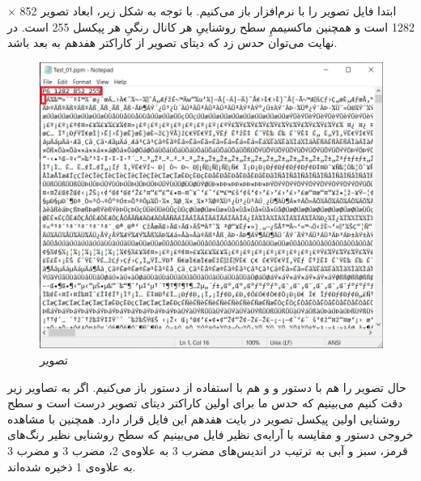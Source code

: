 \documentclass{article}
\begin{document}


\newpage


\section{}%
ابتدا فایل تصویر را با نرم‌افزار  باز می‌کنیم. با توجه به شکل زیر، ابعاد تصویر
852
$\times$
1282 است و همچنین ماکسیممِ سطح روشناییِ هر کانال رنگیِ هر پیکسل 255 است. در نهایت می‌توان حدس زد که دیتای تصویر از کاراکتر هفدهم به بعد باشد.
\begin{figure}[H]
    \centering
    \includegraphics[width=1\textwidth]{figures/1a.jpg}
    \caption
	{
تصویر
	}
    \label{fig:fig1}
\end{figure}
حال تصویر را هم با دستور  و  و هم با استفاده از دستور  باز می‌کنیم. اگر به تصاویر زیر دقت کنیم می‌بینیم که حدس ما برای اولین کاراکتر دیتای تصویر درست است و سطح روشنایی اولین پیکسل تصویر در بایت هفدهم این فایل قرار دارد. همچنین با مشاهده خروجی دستور  و مقایسه با آرایه‌ی نظیر فایل می‌بینیم که سطح روشنایی نظیر رنگ‌های قرمز، سبز و آبی به ترتیب در اندیس‌های مضرب 3 به علاوه‌ی 2، مضرب 3 و مضرب 3 به علاوه‌ی 1 ذخیره شده‌اند.
\end{document}
